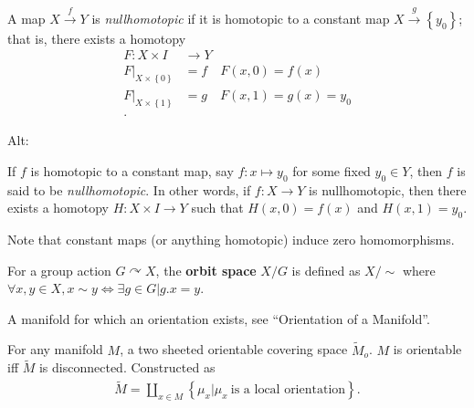 \begin{definition}[Nullhomotopic]

A map \(X\xrightarrow{f} Y\) is \emph{nullhomotopic} if it is homotopic
to a constant map \(X \xrightarrow{g} \left\{{y_{0}}\right\}\); that is,
there exists a homotopy
\begin{align*}  
F: X\times I &\to Y \\
 {\left.{{F}} \right|_{{X\times\left\{{0}\right\}}} }  &= f \quad F(x, 0) = f(x) \\
 {\left.{{F}} \right|_{{X\times\left\{{1}\right\}}} }  &= g  \quad F(x, 1) = g(x) = y_{0}\\
.\end{align*}

Alt:

If \(f\) is homotopic to a constant map, say \(f: x \mapsto y_0\) for
some fixed \(y_0 \in Y\), then \(f\) is said to be \emph{nullhomotopic}.
In other words, if \(f:X\to Y\) is nullhomotopic, then there exists a
homotopy \(H: X\times I \to Y\) such that \(H(x, 0) = f(x)\) and
\(H(x, 1) = y_0\).

Note that constant maps (or anything homotopic) induce zero
homomorphisms.

\end{definition}

\begin{definition}

For a group action \(G\curvearrowright X\), the \textbf{orbit space}
\(X/G\) is defined as \(X/\sim\) where
\(\forall x,y\in X, x\sim y \iff \exists g\in G \mathrel{\Big|}g.x = y\).

\end{definition}

\begin{definition}

A manifold for which an orientation exists, see ``Orientation of a
Manifold''.

\end{definition}

\begin{definition}

For any manifold \(M\), a two sheeted orientable covering space
\(\tilde M_{o}\). \(M\) is orientable iff \(\tilde M\) is disconnected.
Constructed as
\begin{align*}
\tilde M = \coprod_{x\in M}\left\{{\mu_{x} \mathrel{\Big|}\mu_{x}~ \text{is a local orientation}}\right\}
.\end{align*}

\end{definition}

